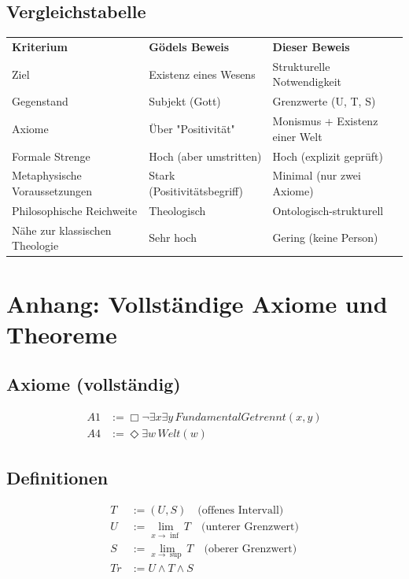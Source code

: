 \documentclass[
]{article}
\begin{document}
\subsection{Vergleichstabelle}\label{vergleichstabelle}

\begin{tabular}{lll}
\textbf{Kriterium} & \textbf{Gödels Beweis} & \textbf{Dieser Beweis} \\
Ziel & Existenz eines Wesens & Strukturelle Notwendigkeit \\
Gegenstand & Subjekt (Gott) & Grenzwerte (U, T, S) \\
Axiome & Über "Positivität" & Monismus + Existenz einer Welt \\
Formale Strenge & Hoch (aber umstritten) & Hoch (explizit geprüft) \\
Metaphysische Voraussetzungen & Stark (Positivitätsbegriff) & Minimal (nur zwei Axiome) \\
Philosophische Reichweite & Theologisch & Ontologisch-strukturell \\
Nähe zur klassischen Theologie & Sehr hoch & Gering (keine Person) \\
\end{tabular}

\section{Anhang: Vollständige Axiome und Theoreme}\label{anhang-vollstuxe4ndige-axiome-und-theoreme}

\subsection{Axiome (vollständig)}\label{axiome-vollstuxe4ndig}

\[
\begin{aligned}
A1 &:= \Box\neg\exists x\exists y\, FundamentalGetrennt(x,y) \\
A4 &:= \Diamond\exists w\, Welt(w)
\end{aligned}
\]

\subsection{Definitionen}\label{definitionen}

\[
\begin{aligned}
T &:= (U, S) \quad \text{(offenes Intervall)} \\
U &:= \lim_{x \to \inf} T \quad \text{(unterer Grenzwert)} \\
S &:= \lim_{x \to \sup} T \quad \text{(oberer Grenzwert)} \\
Tr &:= U \land T \land S
\end{aligned}
\]
\end{document}
